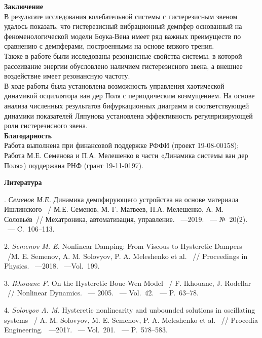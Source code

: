 \textbf{Заключение}\\
В результате исследования колебательной системы с гистерезисным звеном удалось показать, что гистерезисный вибрационный демпфер основанный на феноменологической модели Боука-Вена имеет ряд важных преимуществ по сравнению с демпферами, построенными на основе вязкого трения.\\
Также в работе были исследованы резонансные свойства системы, в которой рассеивание энергии обусловлено наличием гистерезисного звена, а внешнее воздействие имеет резонансную частоту.\\
В ходе работы была установлена возможность управления хаотической динамикой осциллятора ван дер Поля с периодическим возмущением. На основе анализа численных результатов бифуркационных диаграмм и соответствующей динамики показателей Ляпунова установлена эффективность регуляризирующей роли гистерезисного звена.\\

\textbf{Благодарность}\\
Работа выполнена при финансовой поддержке РФФИ (проект 19-08-00158);\\
Работа М.Е. Семенова и П.А. Мелешенко в части «Динамика системы ван дер Поля») поддержана РНФ (грант 19-11-0197).

\smallskip \centerline {\bf Литература} . {\it Семенов М.Е.} Динамика демпфирующего устройства на основе материала Ишлинского ~/ М.Е. Семенов, М. Г. Матвеев, П.А. Мелешенко, А. М. Соловьёв~// Мехатроника, автоматизация, управление. ~---2019. ~--- №~20(2). ~--- C.~106--113.

2. {\it Semenov M. E.} Nonlinear Damping: From Viscous to Hysteretic Dampers ~/M. E. Semenov, A. M. Solovyov, P. A. Meleshenko et al. ~// Proceedings in Physics. ~---2018. ~---Vol.~199.

3. {\it Ikhouane F.} On the Hysteretic Bouc-Wen Model ~/ F. Ikhouane, J. Rodellar ~// Nonlinear Dynamics. ~--- 2005. ~--- Vol.~42. ~--- P.~63--78.

4. {\it Solovyov A. M.} Hysteretic nonlinearity and unbounded solutions in oscillating systems ~/ A. M. Solovyov, M. E. Semenov, P. A. Meleshenko et al. ~// Procedia Engineering. ~---2017. ~--- Vol.~201. ~--- P.~578--583.
